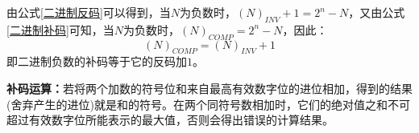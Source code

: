 由公式\ref{二进制反码}可以得到，当$ N $为负数时，$ \left( N \right)_{INV} + 1 = 2^{n} - N $，又由公式\ref{二进制补码}可知，当$ N $为负数时，$ \left( N \right)_{COMP} = 2^{n} - N $，因此：
\begin{equation}
    \left( N \right)_{COMP} = \left( N \right)_{INV} + 1
\end{equation}
即二进制负数的补码等于它的反码加$ 1 $。

\textbf{补码运算：}若将两个加数的符号位和来自最高有效数字位的进位相加，得到的结果(舍弃产生的进位)就是和的符号。在两个同符号数相加时，它们的绝对值之和不可超过有效数字位所能表示的最大值，否则会得出错误的计算结果。